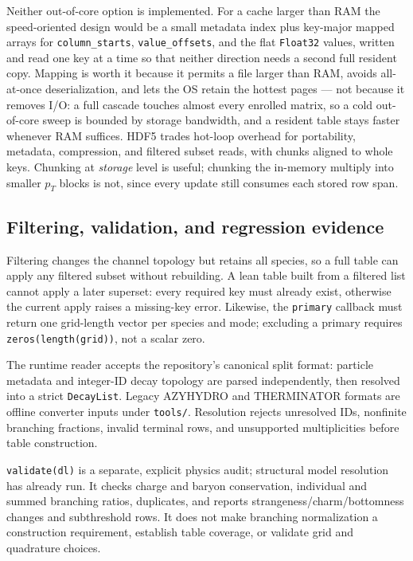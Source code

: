 \documentclass[11pt]{article}
\begin{document}
Neither out-of-core option is implemented.  For a cache larger than RAM the
speed-oriented design would be a small metadata index plus key-major mapped
arrays for \texttt{column\_starts}, \texttt{value\_offsets}, and the flat
\texttt{Float32} values, written and read one key at a time so that neither
direction needs a second full resident copy.  Mapping is worth it because it
permits a file larger than RAM, avoids all-at-once deserialization, and lets
the OS retain the hottest pages --- not because it removes I/O: a full
cascade touches almost every enrolled matrix, so a cold out-of-core sweep is
bounded by storage bandwidth, and a resident table stays faster whenever RAM
suffices.  HDF5 trades hot-loop overhead for portability, metadata,
compression, and filtered subset reads, with chunks aligned to whole keys.
Chunking at \emph{storage} level is useful; chunking the in-memory multiply
into smaller $p_T$ blocks is not, since every update still consumes each
stored row span.

\subsection{Filtering, validation, and regression evidence}

Filtering changes the channel topology but retains all species, so a full
table can apply any filtered subset without rebuilding.  A lean table built
from a filtered list cannot apply a later superset: every required key must
already exist, otherwise the current apply raises a missing-key error.
Likewise, the \texttt{primary} callback must return one grid-length vector per
species and mode; excluding a primary requires \texttt{zeros(length(grid))},
not a scalar zero.

The runtime reader accepts the repository's canonical split format: particle
metadata and integer-ID decay topology are parsed independently, then resolved
into a strict \texttt{DecayList}.  Legacy AZYHYDRO and THERMINATOR formats are
offline converter inputs under \texttt{tools/}.  Resolution rejects unresolved
IDs, nonfinite branching fractions, invalid terminal rows, and unsupported
multiplicities before table construction.

\texttt{validate(dl)} is a separate, explicit physics audit; structural model
resolution has already run.  It checks charge and baryon conservation,
individual and summed branching ratios, duplicates, and reports
strangeness/charm/bottomness changes and subthreshold rows.  It does not make
branching normalization a construction requirement, establish table coverage,
or validate grid and quadrature choices.
\end{document}
